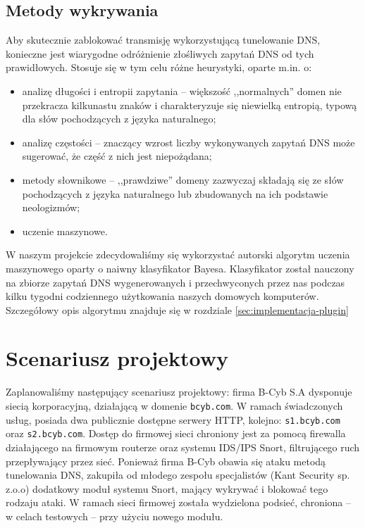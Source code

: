 \documentclass{eiti-raport}
\begin{document}
\subsection{Metody wykrywania} \label{sec:wykrywanie}
Aby skutecznie zablokować transmisję wykorzystującą tunelowanie DNS, konieczne jest wiarygodne odróżnienie złośliwych zapytań DNS od tych prawidłowych. Stosuje się w tym celu różne heurystyki, oparte m.in. o:
\begin{itemize}
	\item analizę długości i entropii zapytania -- większość ,,normalnych'' domen nie przekracza kilkunastu znaków i charakteryzuje się niewielką entropią, typową dla słów pochodzących z języka naturalnego;
	\item analizę częstości -- znaczący wzrost liczby wykonywanych zapytań DNS może sugerować, że część z nich jest niepożądana;
	\item metody słownikowe -- ,,prawdziwe'' domeny zazwyczaj składają się ze słów pochodzących z języka naturalnego lub zbudowanych na ich podstawie neologizmów;
	\item uczenie maszynowe.
\end{itemize}
W naszym projekcie zdecydowaliśmy się wykorzystać autorski algorytm uczenia maszynowego oparty o naiwny klasyfikator Bayesa. Klasyfikator został nauczony na zbiorze zapytań DNS wygenerowanych i przechwyconych przez nas podczas kilku tygodni codziennego użytkowania naszych domowych komputerów. Szczegółowy opis algorytmu znajduje się w rozdziale \ref{sec:implementacja-plugin} 

\section{Scenariusz projektowy} \label{sec:scenariusz}
Zaplanowaliśmy następujący scenariusz projektowy: firma B-Cyb S.A dysponuje siecią korporacyjną, działającą w domenie \texttt{bcyb.com}. W ramach świadczonych usług, posiada dwa publicznie dostępne serwery HTTP, kolejno: \texttt{s1.bcyb.com} oraz \texttt{s2.bcyb.com}. Dostęp do firmowej sieci chroniony jest za pomocą firewalla działającego na firmowym routerze oraz systemu IDS/IPS Snort, filtrującego ruch przepływający przez sieć. Ponieważ firma B-Cyb obawia się ataku metodą tunelowania DNS, zakupiła od młodego zespołu specjalistów (Kant Security sp. z.o.o) dodatkowy moduł systemu Snort, mający wykrywać i blokować tego rodzaju ataki. W ramach sieci firmowej została wydzielona podsieć, chroniona -- w celach testowych -- przy użyciu nowego modułu. 
\end{document}

